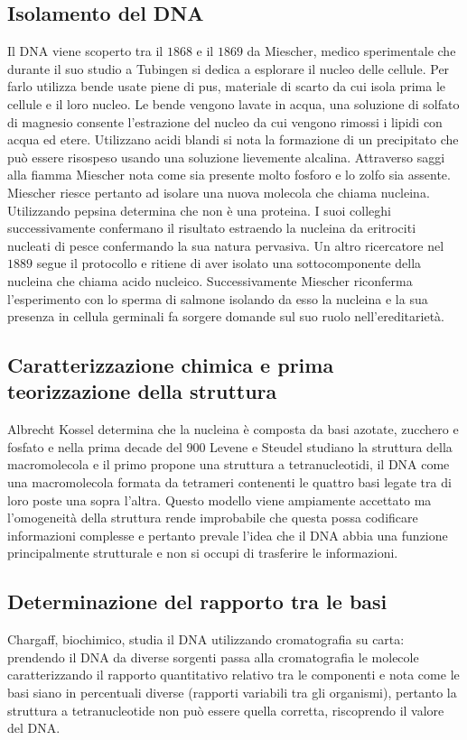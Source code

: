 \subsection{Isolamento del DNA}
Il DNA viene scoperto tra il $1868$ e il $1869$ da Miescher, medico sperimentale che durante il suo studio a Tubingen si dedica a esplorare il nucleo delle cellule. Per farlo utilizza
bende usate piene di pus, materiale di scarto da cui isola prima le cellule e il loro nucleo. Le bende vengono lavate in acqua, una soluzione di solfato di magnesio consente l'estrazione
del nucleo da cui vengono rimossi i lipidi con acqua ed etere. Utilizzano acidi blandi si nota la formazione di un precipitato  che pu\`o essere risospeso usando una soluzione lievemente
alcalina. Attraverso saggi alla fiamma Miescher nota come sia presente molto fosforo e lo zolfo sia assente. Miescher riesce pertanto ad isolare una nuova molecola che chiama nucleina. 
Utilizzando pepsina determina che non \`e una proteina. I suoi colleghi successivamente confermano il risultato estraendo la nucleina da eritrociti nucleati di pesce confermando la 
sua natura pervasiva. Un altro ricercatore nel $1889$ segue il protocollo e ritiene di aver isolato una sottocomponente della nucleina che chiama acido nucleico. Successivamente 
Miescher riconferma l'esperimento con lo sperma di salmone isolando da esso la nucleina e la sua presenza in cellula germinali fa sorgere domande sul suo ruolo nell'ereditariet\`a. 
\subsection{Caratterizzazione chimica e prima teorizzazione della struttura}
Albrecht Kossel determina che la nucleina \`e composta da basi azotate, zucchero e fosfato e nella prima decade del $900$ Levene e Steudel studiano la struttura della macromolecola e 
il primo propone una struttura a tetranucleotidi, il DNA come una macromolecola formata da tetrameri contenenti le quattro basi legate tra di loro poste una sopra l'altra. Questo modello
viene ampiamente accettato ma l'omogeneit\`a della struttura rende improbabile che questa possa codificare informazioni complesse e pertanto prevale l'idea che il DNA abbia una funzione
principalmente strutturale e non si occupi di trasferire le informazioni. 
\subsection{Determinazione del rapporto tra le basi}
Chargaff, biochimico, studia il DNA utilizzando cromatografia su carta: prendendo il DNA da diverse sorgenti passa alla cromatografia le molecole caratterizzando il rapporto quantitativo
relativo tra le componenti e nota come le basi siano in percentuali diverse (rapporti variabili tra gli organismi), pertanto la struttura a tetranucleotide non pu\`o essere quella 
corretta, riscoprendo il valore del DNA. 
